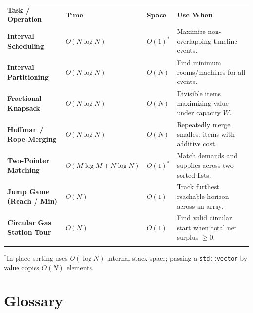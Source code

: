 \documentclass[11pt,a4paper]{article}
\theoremstyle{definition}
\begin{document}
\begingroup\small{}
\begin{tabularx}{\textwidth}{>{\raggedright\arraybackslash\bfseries}p{4.2cm} >{\centering\arraybackslash}p{2.0cm} >{\centering\arraybackslash}p{1.6cm} >{\raggedright\arraybackslash}X}
\arrayrulecolor{primaryblue}\toprule[1.2pt]
\rowcolor{primaryblue!10}
\textcolor{primaryblue}{\textbf{Task / Operation}} & \textcolor{primaryblue}{\textbf{Time}} & \textcolor{primaryblue}{\textbf{Space}} & \textcolor{primaryblue}{\textbf{Use When}} \\
\arrayrulecolor{codeframe}\midrule[0.6pt]
Interval Scheduling & $O(N \log N)$ & $O(1)^*$ & Maximize non-overlapping timeline events. \\
Interval Partitioning & $O(N \log N)$ & $O(N)$ & Find minimum rooms/machines for all events. \\
Fractional Knapsack & $O(N \log N)$ & $O(N)$ & Divisible items maximizing value under capacity $W$. \\
Huffman / Rope Merging & $O(N \log N)$ & $O(N)$ & Repeatedly merge smallest items with additive cost. \\
Two-Pointer Matching & $O(M \log M + N \log N)$ & $O(1)^*$ & Match demands and supplies across two sorted lists. \\
Jump Game (Reach / Min) & $O(N)$ & $O(1)$ & Track furthest reachable horizon across an array. \\
Circular Gas Station Tour & $O(N)$ & $O(1)$ & Find valid circular start when total net surplus $\ge 0$. \\
\arrayrulecolor{primaryblue}\bottomrule[1.2pt]
\end{tabularx}\endgroup

{\footnotesize\color{codegray}$^*$In-place sorting uses $O(\log N)$ internal stack space; passing a \texttt{std::vector} by value copies $O(N)$ elements.}

\section{Glossary}
\end{document}
